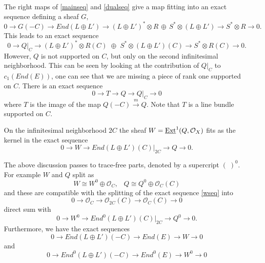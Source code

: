 \documentclass{amsart}
\theoremstyle{plain}
\numberwithin{equation}{section}
\begin{document}
The right maps of \eqref{mainseq} and \eqref{dualseq} give 
a map fitting into an exact sequence defining a sheaf $G$,
$$
0\rightarrow G(-C) \rightarrow 
End(L\oplus L')\rightarrow 
(L\oplus L')^{\ast}\otimes R\,  \oplus \, 
S^{\ast}\otimes (L\oplus L')\rightarrow 
S^{\ast}\otimes R \rightarrow 0.
$$
This leads to an exact sequence 
\begin{equation}
\label{qcseq}
0\rightarrow Q|_C\rightarrow (L\oplus L')^{\ast}\otimes R(C)\,\,  \oplus \, \,
S^{\ast}\otimes (L\oplus L')(C)\rightarrow 
S^{\ast}\otimes R(C) \rightarrow 0.
\end{equation}
However, $Q$ is not supported on $C$, but only on the second infinitesimal neighborhood.
This can be seen by looking at the contribution of $Q|_C$ to $c_1(End(E))$,
one can see that we are missing a piece of rank one supported on $C$. There is 
an exact sequence
$$
0\rightarrow T \rightarrow Q \rightarrow Q|_C\rightarrow 0
$$
where $T$ is the image of the map $Q(-C)\stackrel{m}{\rightarrow} Q$. 
Note that $T$ is a line bundle supported on $C$. 

On the infinitesimal neighborhood $2C$ the sheaf
$W= {\underline{{\rm Ext}}} ^1(Q,{{\mathcal O}} _X)$ fits as the kernel in the exact sequence
\begin{equation}
\label{wseq}
0\rightarrow W \rightarrow End (L\oplus L')(C)|_{2C} \rightarrow Q \rightarrow 0.
\end{equation}

The above discussion passes to trace-free parts, denoted by a supercript $(\; )^0$. For example $W$ and $Q$ split as
$$
W\cong W^0\oplus {{\mathcal O}} _C,\;\;\; Q \cong Q^0\oplus {{\mathcal O}} _C(C)
$$
and these are compatible with the splitting of the exact sequence \eqref{wseq}
into 
$$
0\rightarrow {{\mathcal O}} _C \rightarrow {{\mathcal O}} _{2C}(C)\rightarrow {{\mathcal O}} _C(C)\rightarrow 0
$$
direct sum with
\begin{equation}
\label{woseq}
0\rightarrow W^0 \rightarrow End ^0(L\oplus L')(C)|_{2C} \rightarrow Q^0 \rightarrow 0.
\end{equation}
Furthermore, we have the exact sequences 
\begin{equation}
\label{wbigseq}
0\rightarrow End (L\oplus L')(-C) \rightarrow End (E) \rightarrow W\rightarrow 0
\end{equation}
and 
\begin{equation}
\label{wobigseq}
0\rightarrow End ^0(L\oplus L')(-C) \rightarrow End ^0(E) \rightarrow W^0\rightarrow 0
\end{equation}
\end{document}
